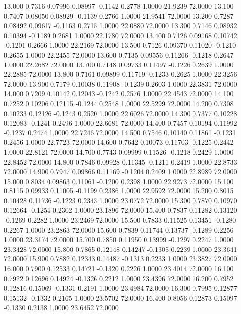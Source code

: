   13.000   0.7316   0.07996   0.08997  -0.1142   0.2778   1.0000  21.9239  72.0000
  13.100   0.7407   0.08050   0.08929  -0.1139   0.2766   1.0000  21.9541  72.0000
  13.200   0.7287   0.08492   0.09617  -0.1163   0.2715   1.0000  22.0880  72.0000
  13.300   0.7146   0.08932   0.10394  -0.1189   0.2681   1.0000  22.1780  72.0000
  13.400   0.7126   0.09168   0.10742  -0.1201   0.2666   1.0000  22.2169  72.0000
  13.500   0.7126   0.09370   0.11020  -0.1210   0.2655   1.0000  22.2455  72.0000
  13.600   0.7135   0.09556   0.11266  -0.1218   0.2647   1.0000  22.2682  72.0000
  13.700   0.7148   0.09733   0.11497  -0.1226   0.2639   1.0000  22.2885  72.0000
  13.800   0.7161   0.09899   0.11719  -0.1233   0.2625   1.0000  22.3256  72.0000
  13.900   0.7179   0.10038   0.11908  -0.1239   0.2603   1.0000  22.3831  72.0000
  14.000   0.7209   0.10142   0.12043  -0.1242   0.2576   1.0000  22.4543  72.0000
  14.100   0.7252   0.10206   0.12115  -0.1244   0.2548   1.0000  22.5299  72.0000
  14.200   0.7308   0.10233   0.12126  -0.1243   0.2520   1.0000  22.6026  72.0000
  14.300   0.7377   0.10228   0.12083  -0.1241   0.2496   1.0000  22.6681  72.0000
  14.400   0.7457   0.10194   0.11992  -0.1237   0.2474   1.0000  22.7246  72.0000
  14.500   0.7546   0.10140   0.11861  -0.1231   0.2456   1.0000  22.7723  72.0000
  14.600   0.7642   0.10073   0.11703  -0.1225   0.2442   1.0000  22.8121  72.0000
  14.700   0.7743   0.09999   0.11526  -0.1218   0.2429   1.0000  22.8452  72.0000
  14.800   0.7846   0.09928   0.11345  -0.1211   0.2419   1.0000  22.8733  72.0000
  14.900   0.7947   0.09866   0.11169  -0.1204   0.2409   1.0000  22.8989  72.0000
  15.000   0.8034   0.09863   0.11061  -0.1200   0.2398   1.0000  22.9273  72.0000
  15.100   0.8115   0.09933   0.11005  -0.1199   0.2386   1.0000  22.9592  72.0000
  15.200   0.8015   0.10428   0.11736  -0.1223   0.2343   1.0000  23.0772  72.0000
  15.300   0.7870   0.10970   0.12664  -0.1254   0.2302   1.0000  23.1896  72.0000
  15.400   0.7837   0.11282   0.13120  -0.1269   0.2282   1.0000  23.2469  72.0000
  15.500   0.7833   0.11525   0.13451  -0.1280   0.2267   1.0000  23.2863  72.0000
  15.600   0.7839   0.11744   0.13737  -0.1289   0.2256   1.0000  23.3174  72.0000
  15.700   0.7850   0.11950   0.13999  -0.1297   0.2247   1.0000  23.3428  72.0000
  15.800   0.7865   0.12148   0.14247  -0.1305   0.2239   1.0000  23.3641  72.0000
  15.900   0.7882   0.12343   0.14487  -0.1313   0.2233   1.0000  23.3827  72.0000
  16.000   0.7900   0.12533   0.14721  -0.1320   0.2226   1.0000  23.4014  72.0000
  16.100   0.7922   0.12696   0.14924  -0.1326   0.2212   1.0000  23.4396  72.0000
  16.200   0.7952   0.12816   0.15069  -0.1331   0.2191   1.0000  23.4984  72.0000
  16.300   0.7995   0.12877   0.15132  -0.1332   0.2165   1.0000  23.5702  72.0000
  16.400   0.8056   0.12873   0.15097  -0.1330   0.2138   1.0000  23.6452  72.0000
